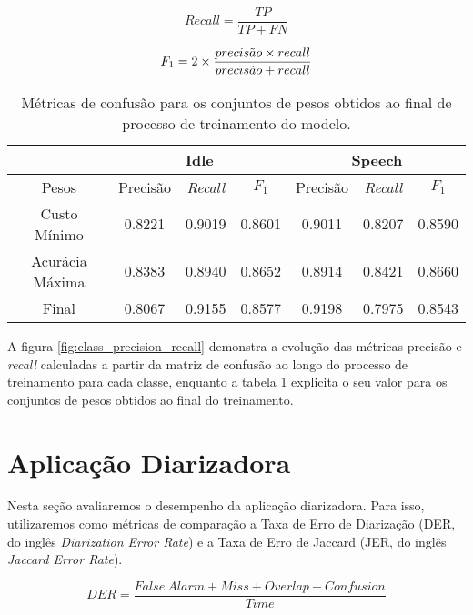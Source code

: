 \begin{equation}\label{eq:recall}
    Recall = \frac{TP}{TP + FN}
\end{equation}

\begin{equation}\label{eq:f1-score}
    F_1 = 2 \times \frac{precis\Tilde{a}o \times recall}{precis\Tilde{a}o + recall}
\end{equation}

\begin{table}[ht]
    \centering
    \begin{tabular}{|c|c|c|c|c|c|c|}
        \toprule
         & \multicolumn{3}{c|}{Idle} & \multicolumn{3}{c|}{Speech}  \\
        \hline
        Pesos & Precisão & \textit{Recall} & $F_1$ & Precisão & \textit{Recall} & $F_1$ \\
        \toprule
        Custo Mínimo & 0.8221 & 0.9019 & 0.8601 & 0.9011 & 0.8207 & 0.8590 \\
        \hline
        Acurácia Máxima & 0.8383 & 0.8940 & 0.8652 & 0.8914 & 0.8421 & 0.8660 \\
        \hline
        Final & 0.8067 & 0.9155 & 0.8577 & 0.9198 & 0.7975 & 0.8543 \\
        \bottomrule
    \end{tabular}
    \caption{Métricas de confusão para os conjuntos de pesos obtidos ao final de processo de treinamento do modelo.}
    \label{tab:confusion_metrics_val}
\end{table}

A figura \ref{fig:class_precision_recall} demonstra a evolução das métricas precisão e \textit{recall} calculadas a partir da matriz de confusão ao longo do processo de treinamento para cada classe, enquanto a tabela \ref{tab:confusion_metrics_val} explicita o seu valor para os conjuntos de pesos obtidos ao final do treinamento.

\section{Aplicação Diarizadora}
\label{sec:results-app}

Nesta seção avaliaremos o desempenho da aplicação diarizadora.
Para isso, utilizaremos como métricas de comparação a Taxa de Erro de Diarização (DER, do inglês \textit{Diarization Error Rate}) e a Taxa de Erro de Jaccard (JER, do inglês \textit{Jaccard Error Rate}).

\begin{equation}\label{eq:der}
    DER = \frac{False\ Alarm + Miss + Overlap + Confusion}{Time} 
\end{equation}

